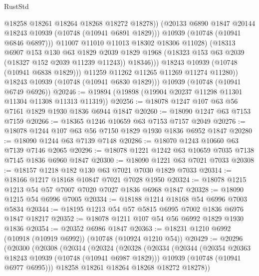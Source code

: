 \begin{lexlean}{RustStd}
\begin{coremodule}
                        @18258
                        @18261
                        @18264
                        @18268
                        @18272
                        @18278))
                    (@20133 @6890 @1847 @20144 @18243 @10939 (@10748 (@10941 @6891 @1829)))
                    @10939
                    (@10748 (@10941 @6846 @6897)))
                  @11007
                  @11010
                  @11013
                  @18302
                  @18306
                  @11028)
                (@18313
                  @6907
                  @153
                  @130
                  @63
                  @1829
                  @2039
                  @1829
                  @1968
                  (@18323 @153 @63 @2039 (@18327 @152 @2039 @11239 @11243))
                  @18346)))
            @18243
            @10939
            (@10748 (@10941 @6838 @1829)))
          @11259
          @11262
          @11265
          @11269
          @11274
          @11280))
      @18243
      @10939
      (@10748 (@10941 @6830 @1829)))
    @10939
    (@10748 (@10941 @6749 @6926))
@20246 := @19894 (@19898 (@19904 @20237 @11298 @11301 @11304 @11308 @11313 @11319))
@20256 := @18078 @1247 @107 @63 @56 @7161 @1829 @1930 @1836 @6944 @1847
@20260 := @18090 @1247 @63 @7153 @7159
@20266 := @18365 @1246 @10659 @63 @7153 @7157 @2049
@20276 := @18078 @1244 @107 @63 @56 @7150 @1829 @1930 @1836 @6952 @1847
@20280 := @18090 @1244 @63 @7139 @7148
@20286 := @18070 @1243 @10660 @63 @7139 @7146 @2065
@20296 := @18078 @1221 @1242 @63 @10659 @7035 @7138 @7145 @1836 @6960 @1847
@20300 := @18090 @1221 @63 @7021 @7033
@20308 := @18157 @1218 @182 @130 @63 @7021 @7030 @1829 @7033
@20314 := @18166 @1217 @18168 @10847 @7021 @7028 @1950
@20324 := @18078 @1215 @1213 @54 @57 @7007 @7020 @7027 @1836 @6968 @1847
@20328 := @18090 @1215 @54 @6996 @7005
@20334 := @18188 @1214 @18168 @54 @6996 @7003 @5834
@20344 := @18195 @1213 @54 @57 @5815 @6995 @7002 @1836 @6976 @1847 @18217
@20352 := @18078 @1211 @107 @54 @56 @6992 @1829 @1930 @1836
@20354 := @20352 @6986 @1847
@20363 := @18231 @1210 @6992 (@10918 (@10919 @6992)) (@10748 (@10924 @1210 @54))
@20429 := @20296
    (@20300
      (@20308
        (@20314
          (@20324
            (@20328
              (@20334
                (@20344
                  (@20354 @20363 @18243 @10939 (@10748 (@10941 @6987 @1829)))
                  @10939
                  (@10748 (@10941 @6977 @6995)))
                @18258
                @18261
                @18264
                @18268
                @18272
                @18278))

\end{coremodule}
\end{lexlean}
